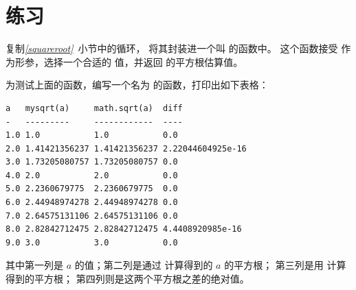 \section{练习}

\begin{exercise}


复制{\em \ref{squareroot}}~小节中的循环， 将其封装进一个叫 {\em {}} 的函数中。 这个函数接受 {\em {}} 作为形参，选择一个合适的 {\em {}} 值，并返回 {\em {}} 的平方根估算值。


为测试上面的函数，编写一个名为 {\em {}} 的函数，打印出如下表格：

\begin{em}
\begin{lstlisting}
a   mysqrt(a)     math.sqrt(a)  diff
-   ---------     ------------  ----
1.0 1.0           1.0           0.0
2.0 1.41421356237 1.41421356237 2.22044604925e-16
3.0 1.73205080757 1.73205080757 0.0
4.0 2.0           2.0           0.0
5.0 2.2360679775  2.2360679775  0.0
6.0 2.44948974278 2.44948974278 0.0
7.0 2.64575131106 2.64575131106 0.0
8.0 2.82842712475 2.82842712475 4.4408920985e-16
9.0 3.0           3.0           0.0
\end{lstlisting}
\end{em}

%

其中第一列是 $a$ 的值；第二列是通过 {\em {}} 计算得到的 $a$ 的平方根； 第三列是用 {\em {}} 计算得到的平方根； 第四列则是这两个平方根之差的绝对值。

\end{exercise}


